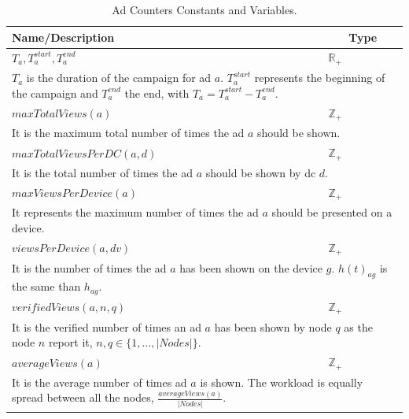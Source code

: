 \begin{table}[!ht]
	\begin{tabular}{|p{7cm}|p{.2cm}| }
		\hline
			Name/Description & \multicolumn{1}{c|}{Type} \\
		\hline
		\hline
			$T_{a}, T^{start}_{a}, T^{end}_{a}$ & $\mathbb{R}_{+}$ \\
		\hline
			 \multicolumn{2}{|p{7.1cm}|}{$T_{a}$ is the duration of the campaign for ad $a$.
			$T^{start}_{a}$ represents the beginning of the campaign and $T^{end}_{a}$ the end, with $T_{a}= T^{start}_{a} - T^{end}_{a}$.}\\
		\hline
		\hline
			$maxTotalViews(a)$ & $\mathbb{Z}_{+}$ \\
		\hline
			\multicolumn{2}{|p{7.1cm}|}{It is the maximum total number of times the ad $a$ should be shown.} \\
		\hline
		\hline
			$maxTotalViewsPerDC(a, d)$ & $\mathbb{Z}_{+}$ \\
		\hline
			 \multicolumn{2}{|p{7.1cm}|}{It is the total number of times the ad $a$ should be shown by \gls{dc} $d$.} \\
		\hline
		\hline
			$maxViewsPerDevice(a)$ & $\mathbb{Z}_{+}$ \\
		\hline
			\multicolumn{2}{|p{7.1cm}|}{It represents the maximum number of times the ad $a$ should be presented on a device.} \\
		\hline
		\hline
			$viewsPerDevice(a, dv)$ & $\mathbb{Z}_{+}$ \\
		\hline
			\multicolumn{2}{|p{7.1cm}|}{It is the number of times the ad $a$ has been shown on the device $g$. $h(t)_{ag}$ is the same than $h_{ag}$.} \\
		\hline
		\hline
			$verifiedViews(a, n, q)$ & $\mathbb{Z}_{+}$ \\
		\hline
			\multicolumn{2}{|p{7.1cm}|}{It is the verified number of times an ad $a$ has been shown by node $q$ as the node $n$ report it, $n, q \in \{1,\dots, |Nodes|\}$.} \\
		\hline
		\hline
			$averageViews(a)$ & $\mathbb{Z}_{+}$ \\
		\hline
			\multicolumn{2}{|p{8.1cm}|}{It is the average number of times ad $a$ is shown. The workload is equally spread between all the nodes, $\frac{averageViews(a)}{|Nodes|}$.} \\
		\hline
	\end{tabular}

	\caption{Ad Counters Constants and Variables.}
	\label{tab:ads_constants_variables}
\end{table}

